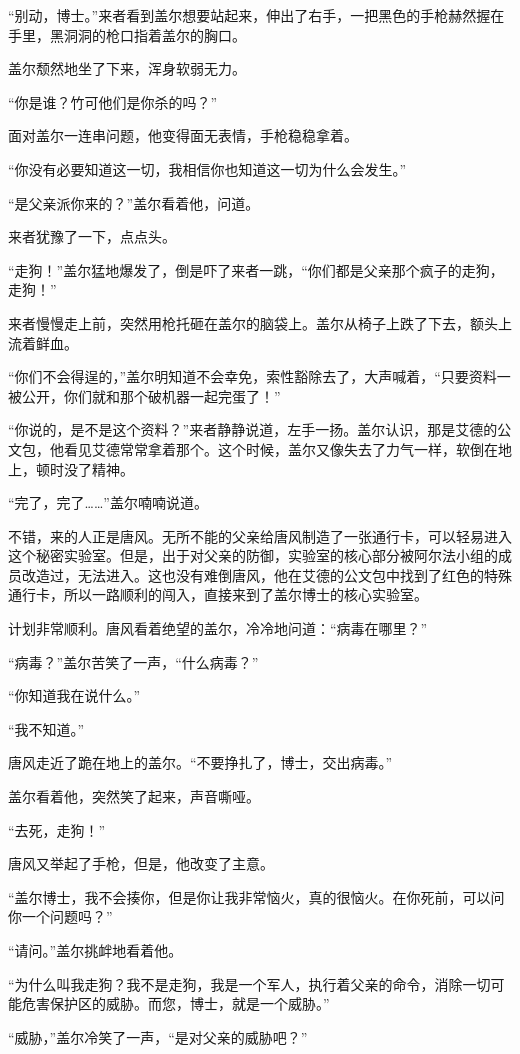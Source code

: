 “别动，博士。”来者看到盖尔想要站起来，伸出了右手，一把黑色的手枪赫然握在手里，黑洞洞的枪口指着盖尔的胸口。

盖尔颓然地坐了下来，浑身软弱无力。

“你是谁？竹可他们是你杀的吗？”

面对盖尔一连串问题，他变得面无表情，手枪稳稳拿着。

“你没有必要知道这一切，我相信你也知道这一切为什么会发生。”

“是父亲派你来的？”盖尔看着他，问道。

来者犹豫了一下，点点头。

“走狗！”盖尔猛地爆发了，倒是吓了来者一跳，“你们都是父亲那个疯子的走狗，走狗！”

来者慢慢走上前，突然用枪托砸在盖尔的脑袋上。盖尔从椅子上跌了下去，额头上流着鲜血。

“你们不会得逞的，”盖尔明知道不会幸免，索性豁除去了，大声喊着，“只要资料一被公开，你们就和那个破机器一起完蛋了！”

“你说的，是不是这个资料？”来者静静说道，左手一扬。盖尔认识，那是艾德的公文包，他看见艾德常常拿着那个。这个时候，盖尔又像失去了力气一样，软倒在地上，顿时没了精神。

“完了，完了……”盖尔喃喃说道。

不错，来的人正是唐风。无所不能的父亲给唐风制造了一张通行卡，可以轻易进入这个秘密实验室。但是，出于对父亲的防御，实验室的核心部分被阿尔法小组的成员改造过，无法进入。这也没有难倒唐风，他在艾德的公文包中找到了红色的特殊通行卡，所以一路顺利的闯入，直接来到了盖尔博士的核心实验室。

计划非常顺利。唐风看着绝望的盖尔，冷冷地问道：“病毒在哪里？”

“病毒？”盖尔苦笑了一声，“什么病毒？”

“你知道我在说什么。”

“我不知道。”

唐风走近了跪在地上的盖尔。“不要挣扎了，博士，交出病毒。”

盖尔看着他，突然笑了起来，声音嘶哑。

“去死，走狗！”

唐风又举起了手枪，但是，他改变了主意。

“盖尔博士，我不会揍你，但是你让我非常恼火，真的很恼火。在你死前，可以问你一个问题吗？”

“请问。”盖尔挑衅地看着他。

“为什么叫我走狗？我不是走狗，我是一个军人，执行着父亲的命令，消除一切可能危害保护区的威胁。而您，博士，就是一个威胁。”

“威胁，”盖尔冷笑了一声，“是对父亲的威胁吧？”

